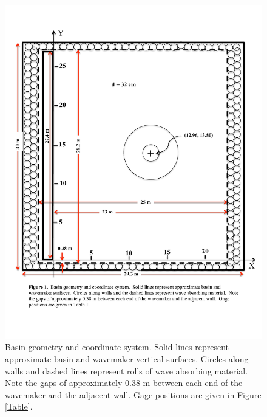 \begin{figure}[ht]
\hfil\includegraphics[width=6.0in]{bp6/Domain.pdf}\hfil
\caption{\label{bp6Domain}
Basin geometry and coordinate system.  Solid lines represent approximate basin and wavemaker vertical surfaces.  Circles along walls and dashed lines represent rolls of wave absorbing material.  Note the gaps of approximately 0.38 m between each end of the wavemaker and the adjacent wall.  Gage positions are given in Figure \ref{Table}.
  }
\end{figure}

